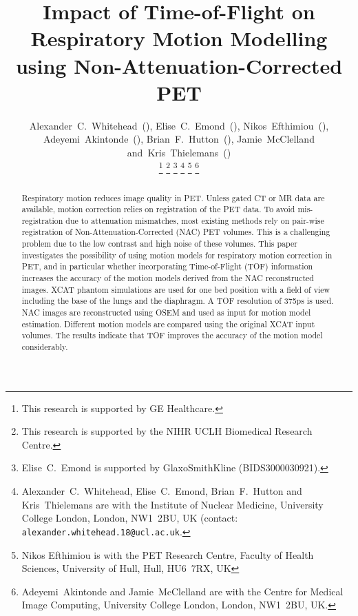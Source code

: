 \documentclass{IEEEtran}
\begin{document}
\title{Impact of Time-of-Flight on Respiratory Motion Modelling using Non-Attenuation-Corrected PET}
\author{Alexander~C.~Whitehead~(),
        Elise~C.~Emond~(),
        Nikos~Efthimiou~(),
        Adeyemi~Akintonde~(),
        Brian~F.~Hutton~(),
        Jamie~McClelland
        and~Kris~Thielemans~()%

    \thanks{This research is supported by GE Healthcare.}%
    \thanks{This research is supported by the NIHR UCLH Biomedical Research Centre.}%
    \thanks{Elise~C.~Emond is supported by GlaxoSmithKline (BIDS3000030921).}%
    \thanks{Alexander~C.~Whitehead, Elise~C.~Emond, Brian~F.~Hutton and Kris~Thielemans are with the Institute of Nuclear Medicine, University College London, London, NW1~2BU, UK (contact: \texttt{alexander.whitehead.18@ucl.ac.uk}.}%
    \thanks{Nikos Efthimiou is with the PET Research Centre, Faculty of Health Sciences, University of Hull, Hull, HU6~7RX, UK}%
    \thanks{Adeyemi~Akintonde and Jamie~McClelland are with the Centre for Medical Image Computing, University College London, London, NW1~2BU, UK.}%
}

\maketitle
\vspace{-1cm}

\IEEEpeerreviewmaketitle
\begin{abstract}
Respiratory motion reduces image quality in PET. Unless gated CT or MR data are available, motion correction relies on registration of the PET data. To avoid mis-registration due to attenuation mismatches, most existing methods rely on pair-wise registration of Non-Attenuation-Corrected (NAC) PET volumes. This is a challenging problem due to the low contrast and high noise of these volumes. This paper investigates the possibility of using motion models for respiratory motion correction in PET, and in particular whether incorporating Time-of-Flight (TOF) information increases the accuracy of the motion models derived from the NAC reconstructed images. XCAT phantom simulations are used for one bed position with a field of view including the base of the lungs and the diaphragm. A TOF resolution of 375ps is used. NAC images are reconstructed using OSEM and used as input for motion model estimation. Different motion models are compared using the original XCAT input volumes. The results indicate that TOF improves the accuracy of the motion model considerably.

\end{abstract}
\end{document}
